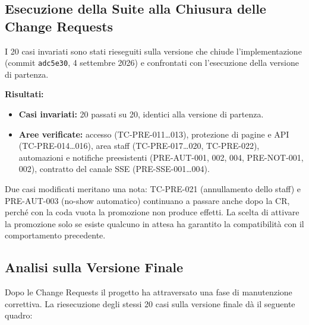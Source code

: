 \documentclass[11pt,a4paper,oneside,openany]{book}
\begin{document}
\subsection{Esecuzione della Suite alla Chiusura delle Change Requests}

I 20 casi invariati sono stati rieseguiti sulla versione che chiude
l'implementazione (commit \texttt{adc5e30}, 4 settembre 2026) e confrontati con
l'esecuzione della versione di partenza.

\textbf{Risultati:}
\begin{itemize}
  \item \textbf{Casi invariati:} 20 passati su 20, identici alla versione di
        partenza.
  \item \textbf{Aree verificate:} accesso (TC-PRE-011\dots013), protezione di
        pagine e API (TC-PRE-014\dots016), area staff (TC-PRE-017\dots020,
        TC-PRE-022), automazioni e notifiche preesistenti (PRE-AUT-001, 002,
        004, PRE-NOT-001, 002), contratto del canale SSE (PRE-SSE-001\dots004).
\end{itemize}

Due casi modificati meritano una nota: TC-PRE-021 (annullamento dello staff)
e PRE-AUT-003 (no-show automatico) continuano a passare anche dopo la CR,
perché con la coda vuota la promozione non produce effetti. La scelta di
attivare la promozione solo se esiste qualcuno in attesa ha garantito la
compatibilità con il comportamento precedente.

\subsection{Analisi sulla Versione Finale}

Dopo le Change Requests il progetto ha attraversato una fase di manutenzione
correttiva. La riesecuzione degli stessi 20 casi sulla versione finale dà il
seguente quadro:
\end{document}
